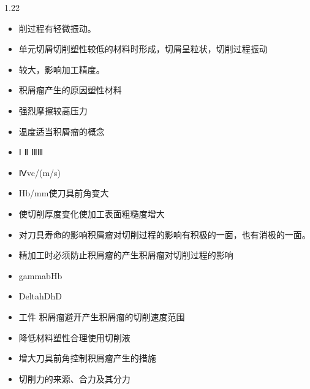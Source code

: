 \documentclass[12pt,a4paper]{article}
\begin{document}
\begin{spacing}{1.22}
\begin{itemize}[leftmargin=2.2em,label=--]
  \item 削过程有轻微振动。
  \item 单元切屑切削塑性较低的材料时形成，切屑呈粒状，切削过程振动
  \item 较大，影响加工精度。
  \item 积屑瘤产生的原因塑性材料
  \item 强烈摩擦较高压力
  \item 温度适当积屑瘤的概念
  \item Ⅰ Ⅱ ⅢⅢ
  \item Ⅳvc/(m/s)
  \item Hb/mm使刀具前角变大
  \item 使切削厚度变化使加工表面粗糙度增大
  \item 对刀具寿命的影响积屑瘤对切削过程的影响有积极的一面，也有消极的一面。
  \item 精加工时必须防止积屑瘤的产生积屑瘤对切削过程的影响
  \item gammabHb
  \item DeltahDhD
  \item 工件 积屑瘤避开产生积屑瘤的切削速度范围
  \item 降低材料塑性合理使用切削液
  \item 增大刀具前角控制积屑瘤产生的措施
  \item 切削力的来源、合力及其分力
\end{itemize}


\end{spacing}
\end{document}
